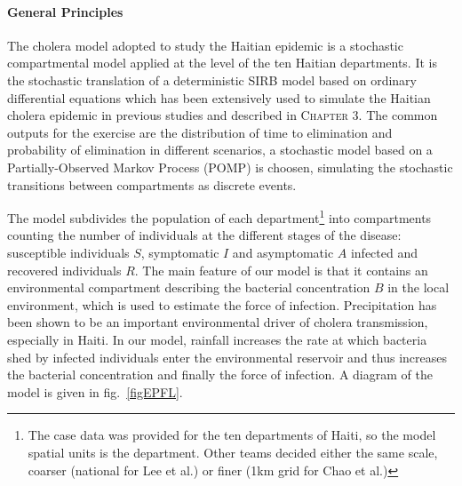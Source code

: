 \paragraph{General Principles}The cholera model adopted to study the Haitian epidemic is a stochastic compartmental model applied at the level of the ten Haitian departments. 
It is the stochastic translation of a deterministic SIRB model based on ordinary differential equations which has been extensively used to simulate the Haitian cholera epidemic in previous studies\cite[-4\baselineskip]{Rinaldo:Reassessment20102011:2012,Bertuzzo:ProbabilityExtinctionHaiti:2016,Pasetto:RealtimeForecastingCholera:2018} and described in \textsc{Chapter 3}. The common outputs for the exercise are the distribution of time to elimination and probability of elimination in different scenarios, a stochastic  model based on a Partially-Observed Markov Process (POMP) is choosen, simulating the stochastic transitions between compartments as discrete events\cite{King:InapparentInfectionsCholera:2008}. 

The model subdivides the population of each department\footnote{The case data was provided for the ten departments of Haiti, so the model spatial units is the department. Other teams decided either the same scale, coarser (national for Lee et al.) or finer (1km grid for Chao et al.)} into compartments counting the number of individuals at the different stages of the disease: susceptible individuals $S$, symptomatic $I$ and asymptomatic $A$ infected and recovered individuals $R$. The main feature of our model is that it contains an environmental compartment describing the bacterial concentration $B$ in the local environment, which is used to estimate the force of infection\cite{Rinaldo:Reassessment20102011:2012, Bertuzzo:PredictionSpatialEvolution:2011}. Precipitation has been shown to be an important environmental driver of cholera transmission\cite{Camacho:CholeraEpidemicYemen:2018}, especially in Haiti. In our model, rainfall increases the rate at which bacteria shed by infected individuals enter the environmental reservoir and thus increases the bacterial concentration and finally the force of infection\cite{Lemaitre:RainfallDriverEpidemic:2019}. A diagram of the model is given in fig.~\ref{figEPFL}.
